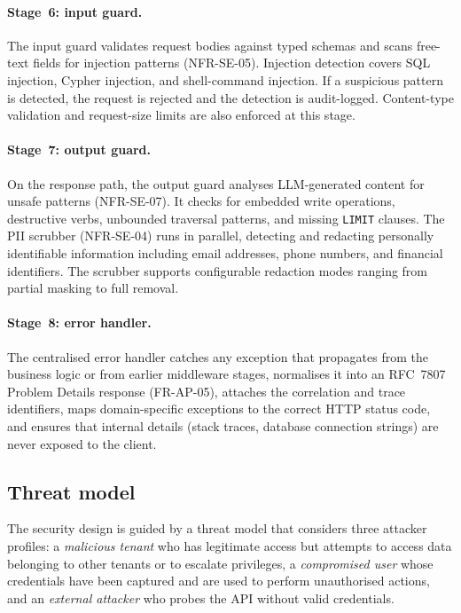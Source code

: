 \documentclass[a4paper,noexaminfo]{sapthesis}
\begin{document}
\paragraph{Stage~6: input guard.}
The input guard validates request bodies against typed schemas and scans
free-text fields for injection patterns (NFR-SE-05).  Injection detection
covers SQL injection, Cypher injection, and shell-command injection.
If a suspicious pattern is detected, the request is rejected and the
detection is audit-logged.  Content-type validation and request-size limits
are also enforced at this stage.

\paragraph{Stage~7: output guard.}
On the response path, the output guard analyses LLM-generated content for
unsafe patterns (NFR-SE-07).  It checks for embedded write operations,
destructive verbs, unbounded traversal patterns, and missing
\texttt{LIMIT} clauses.  The PII scrubber (NFR-SE-04) runs in parallel,
detecting and redacting personally identifiable information including
email addresses, phone numbers, and financial identifiers.  The scrubber
supports configurable redaction modes ranging from partial masking to
full removal.

\paragraph{Stage~8: error handler.}
The centralised error handler catches any exception that propagates from
the business logic or from earlier middleware stages, normalises it into
an RFC~7807 Problem Details response (FR-AP-05), attaches the
correlation and trace identifiers, maps domain-specific exceptions to
the correct HTTP status code, and ensures that internal details (stack
traces, database connection strings) are never exposed to the client.

\subsection{Threat model}

The security design is guided by a threat model that considers three
attacker profiles: a \emph{malicious tenant} who has legitimate access but
attempts to access data belonging to other tenants or to escalate
privileges, a \emph{compromised user} whose credentials have been captured
and are used to perform unauthorised actions, and an \emph{external
attacker} who probes the API without valid credentials.
\end{document}

